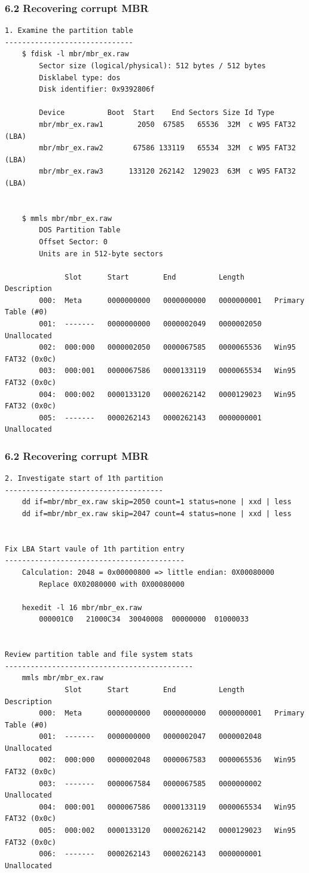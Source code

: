 \begin{frame}[fragile]
  \frametitle{6.2 Recovering corrupt MBR}
  \begin{lstlisting}[basicstyle=\tiny]
1. Examine the partition table
------------------------------
    $ fdisk -l mbr/mbr_ex.raw 
        Sector size (logical/physical): 512 bytes / 512 bytes
        Disklabel type: dos
        Disk identifier: 0x9392806f

        Device          Boot  Start    End Sectors Size Id Type
        mbr/mbr_ex.raw1        2050  67585   65536  32M  c W95 FAT32 (LBA)
        mbr/mbr_ex.raw2       67586 133119   65534  32M  c W95 FAT32 (LBA)
        mbr/mbr_ex.raw3      133120 262142  129023  63M  c W95 FAT32 (LBA)
  
  
    $ mmls mbr/mbr_ex.raw
        DOS Partition Table
        Offset Sector: 0
        Units are in 512-byte sectors

              Slot      Start        End          Length       Description
        000:  Meta      0000000000   0000000000   0000000001   Primary Table (#0)
        001:  -------   0000000000   0000002049   0000002050   Unallocated
        002:  000:000   0000002050   0000067585   0000065536   Win95 FAT32 (0x0c)
        003:  000:001   0000067586   0000133119   0000065534   Win95 FAT32 (0x0c)
        004:  000:002   0000133120   0000262142   0000129023   Win95 FAT32 (0x0c)
        005:  -------   0000262143   0000262143   0000000001   Unallocated
  \end{lstlisting}
\end{frame}


\begin{frame}[fragile]
  \frametitle{6.2 Recovering corrupt MBR}
  \begin{lstlisting}[basicstyle=\tiny]
2. Investigate start of 1th partition
-------------------------------------
    dd if=mbr/mbr_ex.raw skip=2050 count=1 status=none | xxd | less
    dd if=mbr/mbr_ex.raw skip=2047 count=4 status=none | xxd | less


Fix LBA Start vaule of 1th partition entry
------------------------------------------
    Calculation: 2048 = 0x00000800 => little endian: 0X00080000
        Replace 0X02080000 with 0X00080000

    hexedit -l 16 mbr/mbr_ex.raw
        000001C0   21000C34  30040008  00000000  01000033


Review partition table and file system stats
--------------------------------------------
    mmls mbr/mbr_ex.raw 
              Slot      Start        End          Length       Description
        000:  Meta      0000000000   0000000000   0000000001   Primary Table (#0)
        001:  -------   0000000000   0000002047   0000002048   Unallocated
        002:  000:000   0000002048   0000067583   0000065536   Win95 FAT32 (0x0c)
        003:  -------   0000067584   0000067585   0000000002   Unallocated
        004:  000:001   0000067586   0000133119   0000065534   Win95 FAT32 (0x0c)
        005:  000:002   0000133120   0000262142   0000129023   Win95 FAT32 (0x0c)
        006:  -------   0000262143   0000262143   0000000001   Unallocated
  \end{lstlisting}
\end{frame}


